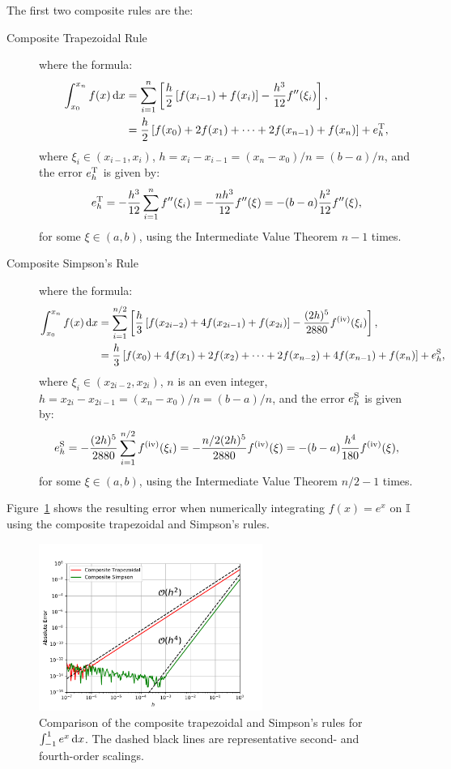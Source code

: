 The first two composite rules are the:
\begin{description}
\item[Composite Trapezoidal Rule] where the formula:
\begin{align*}
\int_{x_0}^{x_n} f(x)\ud x & = \sum_{i=1}^n\left[\dfrac{h}{2}\br[f(x_{i-1})+f(x_i)] - \dfrac{h^3}{12}f''(\xi_i)\right],\\
& = \dfrac{h}{2}\br[f(x_0)+2f(x_1)+\cdots+2f(x_{n-1})+f(x_n)] + e_h^{\rm T},
\end{align*}
where $\xi_i\in(x_{i-1},x_i)$, $h=x_i-x_{i-1} = (x_n-x_0)/n = (b-a)/n$, and the error $e_h^{\rm T}$ is given by:
\[
e_h^{\rm T} = -\dfrac{h^3}{12}\sum_{i=1}^n f''(\xi_i) = -\dfrac{nh^3}{12}f''(\xi) = -(b-a)\dfrac{h^2}{12}f''(\xi),
\]
for some $\xi\in(a,b)$, using the Intermediate Value Theorem $n-1$ times.
\item[Composite Simpson's Rule] where the formula:
\begin{align*}
\int_{x_0}^{x_n} f(x)\ud x & = \sum_{i=1}^{n/2}\left[\dfrac{h}{3}\br[f(x_{2i-2})+4f(x_{2i-1})+f(x_{2i})] - \dfrac{(2h)^5}{2880}f^{({\rm iv})}(\xi_i)\right],\\
& = \dfrac{h}{3}\br[f(x_0)+4f(x_1)+2f(x_2)+\cdots+2f(x_{n-2})+4f(x_{n-1})+f(x_n)] + e_h^{\rm S},
\end{align*}
where $\xi_i\in(x_{2i-2},x_{2i})$, $n$ is an even integer, $h = x_{2i}-x_{2i-1} = (x_n-x_0)/n = (b-a)/n$, and the error $e_h^{\rm S}$ is given by:
\[
e_h^{\rm S} = -\dfrac{(2h)^5}{2880}\sum_{i=1}^{n/2} f^{({\rm iv})}(\xi_i) = -\dfrac{n/2(2h)^5}{2880}f^{({\rm iv})}(\xi) = -(b-a)\dfrac{h^4}{180}f^{({\rm iv})}(\xi),
\]
for some $\xi\in(a,b)$, using the Intermediate Value Theorem $n/2-1$ times.
\end{description}

Figure~\ref{figure:CompositeNewtonCotes} shows the resulting error when numerically integrating $f(x) = e^x$ on $\mathbb{I}$ using the composite trapezoidal and Simpson's rules.

\begin{figure}[htbp]
\begin{center}
\includegraphics[width=0.65\textwidth]{compositenewtoncotes}
\caption{Comparison of the composite trapezoidal and Simpson's rules for $\int_{-1}^1e^x{\rm\,d} x$. The dashed black lines are representative second- and fourth-order scalings.}
\label{figure:CompositeNewtonCotes}
\end{center}
\end{figure}

